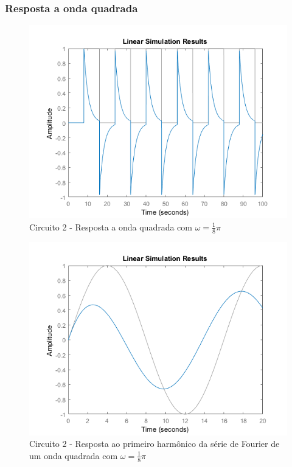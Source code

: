 \documentclass[a4paper, 12pt]{article}
\begin{document}
			\subsubsection{Resposta a onda quadrada}
			\begin{figure}[!ht]
				\centering
				\includegraphics[scale=0.71]{img/1i_circ2.png}
				\caption{Circuito 2 - Resposta a onda quadrada com $\omega = \frac{1}{8}\pi$}	
			\end{figure}			
			\begin{figure}[!ht]
				\centering
				\includegraphics[scale=0.71]{img/1j_circ2.png}
				\caption{Circuito 2 - Resposta ao primeiro harmônico da série de Fourier de um onda quadrada com $\omega = \frac{1}{8}\pi$}	
			\end{figure}		
\end{document}
